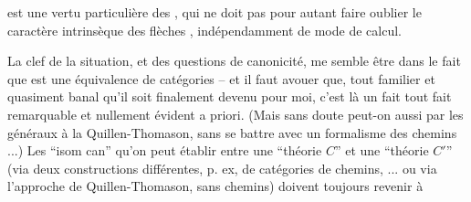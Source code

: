
est une vertu particulière des , qui ne doit pas pour autant faire oublier le caractère intrinsèque des flèches , indépendamment de  mode de calcul.

\margin{\rule{0.35pt}{4\baselineskip}\hspace{2pt}\rule{0.35pt}{4\baselineskip}}%
La clef de la situation, et des questions de canonicité, me semble être dans le fait que  est une équivalence de catégories -- et il faut avouer que, tout familier et quasiment banal qu'il soit finalement devenu pour moi, c'est là un fait tout  fait remarquable et nullement évident a priori. (Mais sans doute peut-on  aussi par les  généraux à la Quillen-Thomason, sans se battre avec un formalisme des chemins ...) Les ``isom can'' qu'on peut établir entre une ``théorie $C$'' et une ``théorie $C'$'' (via deux constructions différentes, p. ex, de catégories de chemins, ... ou via l'approche de Quillen-Thomason, sans chemins) doivent toujours revenir à 
